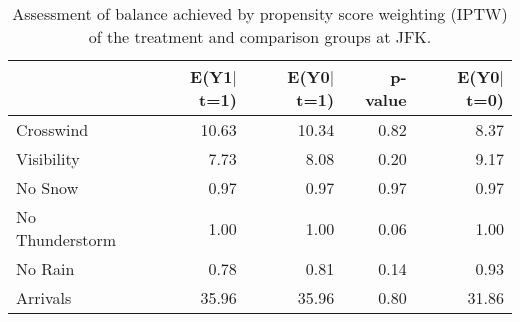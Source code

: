 \documentclass[11pt]{scrartcl}
\begin{document}
\begin{table}[ht]
\centering
\begin{tabular}{lrrrr}
  \hline
 & E(Y1$|$t=1) & E(Y0$|$t=1) & p-value & E(Y0$|$t=0) \\ 
  \hline
  Crosswind & 10.63 & 10.34 & 0.82 & 8.37 \\ 
  Visibility & 7.73 & 8.08 & 0.20 & 9.17 \\ 
  No Snow & 0.97 & 0.97 & 0.97 & 0.97 \\ 
  No Thunderstorm & 1.00 & 1.00 & 0.06 & 1.00 \\ 
  No Rain & 0.78 & 0.81 & 0.14 & 0.93 \\ 
  Arrivals & 35.96 & 35.96 & 0.80 & 31.86 \\ 
   \hline
\end{tabular}
\caption{Assessment of balance achieved by propensity score weighting (IPTW) of the treatment and comparison groups at JFK.} 
\label{tab:balance}
\end{table}
\end{document}
